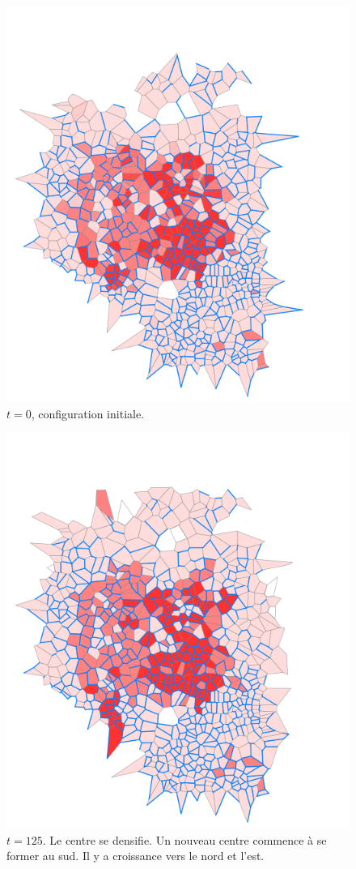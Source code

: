 \documentclass[12pt]{article}
\begin{document}
\begin{figure}[H]
  \centering
  \includegraphics[width=.8\linewidth]{images/lh_0.png}
  \caption{$t = 0$, configuration initiale.}
\end{figure}

\begin{figure}[H]
  \centering
  \includegraphics[width=.8\linewidth]{images/lh_125.png}
  \caption{$t = 125$. Le centre se densifie. Un nouveau centre
    commence à se former au sud. Il y a croissance vers le nord et
    l'est.}
\end{figure}
\end{document}
